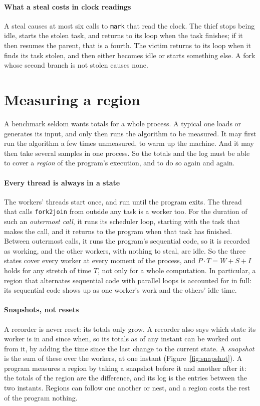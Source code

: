 \documentclass[sigplan,nonacm]{acmart}
\begin{document}
\paragraph{What a steal costs in clock readings}
%
A steal causes at most six calls to \lstinline|mark| that read the
clock.
%
The thief stops being idle, starts the stolen task, and returns to its
loop when the task finishes; if it then resumes the parent, that is a
fourth.
%
The victim returns to its loop when it finds its task stolen, and then
either becomes idle or starts something else.
%
A fork whose second branch is not stolen causes none.

\section{Measuring a region}
\label{sec:region}

A benchmark seldom wants totals for a whole process.
%
A typical one loads or generates its input, and only then runs the
algorithm to be measured.
%
It may first run the algorithm a few times unmeasured, to warm up the
machine.
%
And it may then take several samples in one process.
%
So the totals and the log must be able to cover a \emph{region} of
the program's execution, and to do so again and again.

\paragraph{Every thread is always in a state}
%
The workers' threads start once, and run until the program exits.
%
The thread that calls \lstinline|fork2join| from outside any task is a
worker too.
%
For the duration of such an \emph{outermost call}, it runs its
scheduler loop, starting with the task that makes the call, and it
returns to the program when that task has finished.
%
Between outermost calls, it runs the program's sequential code, so it
is recorded as working, and the other workers, with nothing to steal,
are idle.
%
So the three states cover every worker at every moment of the process,
and $P \cdot T = W + S + I$ holds for any stretch of time $T$, not
only for a whole computation.
%
In particular, a region that alternates sequential code with parallel
loops is accounted for in full: its sequential code shows up as one
worker's work and the others' idle time.

\paragraph{Snapshots, not resets}
%
A recorder is never reset: its totals only grow.
%
A recorder also says which state its worker is in and since when, so
its totals as of any instant can be worked out from it, by adding the
time since the last change to the current state.
%
A \emph{snapshot} is the sum of these over the workers, at one instant
(Figure~\ref{fig:snapshot}).
%
A program measures a region by taking a snapshot before it and another
after it: the totals of the region are the difference, and its log is
the entries between the two instants.
%
Regions can follow one another or nest, and a region costs the rest of
the program nothing.
\end{document}
